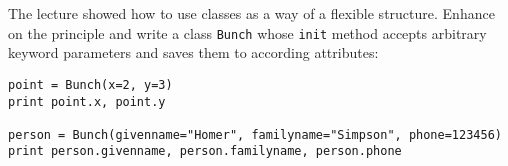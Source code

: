 \newpage

\begin{aufgabe}
The lecture showed how to use classes as a way of a flexible structure. Enhance on the principle and write a class \lstinline{Bunch} whose \lstinline{init} method accepts arbitrary keyword parameters and saves them to according attributes:
\begin{lstlisting}
point = Bunch(x=2, y=3)
print point.x, point.y

person = Bunch(givenname="Homer", familyname="Simpson", phone=123456)
print person.givenname, person.familyname, person.phone
\end{lstlisting}
\end{aufgabe}


